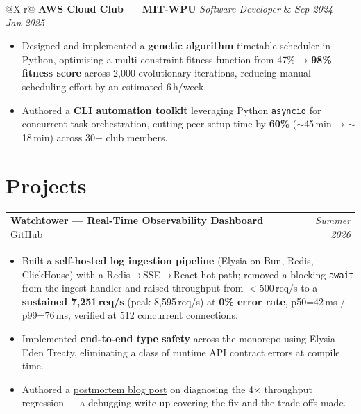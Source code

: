 \documentclass[10pt, letterpaper]{article}
\makeatletter
\newcommand{\roleentry}[4]{%
  \noindent
  \begin{tabularx}{\linewidth}{@{}X r@{}}
    \textbf{#1} \textbar{} \textit{#2} & \textit{\small #3} \\
    \multicolumn{2}{@{}l@{}}{\small\textit{#4}}
  \end{tabularx}%
}
\newcommand{\projectentry}[3]{%
  \noindent
  \begin{tabularx}{\linewidth}{@{}X r@{}}
    \textbf{#1} \textbar{} \href{#2}{\small GitHub} & \textit{\small #3}
  \end{tabularx}%
}
\makeatother
\begin{document}
\vspace{3pt}

\roleentry{AWS Cloud Club — MIT-WPU}{Software Developer}{Sep 2024 – Jan 2025}{Pune, Maharashtra}

\vspace{2pt}
\begin{itemize}
  \item Designed and implemented a \textbf{genetic algorithm} timetable scheduler in Python, optimising a multi-constraint fitness function from 47\% → \textbf{98\% fitness score} across 2{,}000 evolutionary iterations, reducing manual scheduling effort by an estimated 6\,h/week.
  \item Authored a \textbf{CLI automation toolkit} leveraging Python \texttt{asyncio} for concurrent task orchestration, cutting peer setup time by \textbf{60\%} ($\sim$45\,min → $\sim$18\,min) across 30+ club members.
\end{itemize}

\section{Projects}

\vspace{2pt}

\projectentry{Watchtower — Real-Time Observability Dashboard}{https://github.com/penzulo/watchtower}{Summer 2026}

\vspace{2pt}
\begin{itemize}
  \item Built a \textbf{self-hosted log ingestion pipeline} (Elysia on Bun, Redis, ClickHouse) with a Redis\,→\,SSE\,→\,React hot path; removed a blocking \texttt{await} from the ingest handler and raised throughput from $<$500\,req/s to a \textbf{sustained 7,251\,req/s} (peak 8,595\,req/s) at \textbf{0\% error rate}, p50=42\,ms / p99=76\,ms, verified at 512 concurrent connections.
  \item Implemented \textbf{end-to-end type safety} across the monorepo using Elysia Eden Treaty, eliminating a class of runtime API contract errors at compile time.
  \item Authored a \href{https://penzulo.dev/blog/watchtower-throughput.html}{postmortem blog post} on diagnosing the 4$\times$ throughput regression — a debugging write-up covering the fix and the trade-offs made.
\end{itemize}
\end{document}
